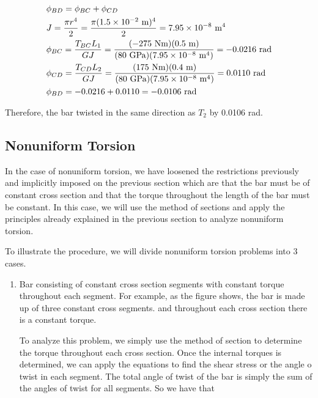 \documentclass[a4paper,openany,12pt]{book}
\begin{document}
$$\begin{gathered}
  \phi_{BD} = \phi _{BC} + \phi _{CD} \hfill \\
  J = \frac{\pi r^4}{2} = \frac{\pi (1.5 \times 10^{ - 2} \text{ m})^4}{2} =
  7.95 \times 10^{ - 8} \text{ m}^4 \hfill \\
  \phi_{BC} = \frac{T_{BC}L_1}{GJ} = \frac{( - 275\text{ Nm})(0.5\text{ m})}{(80\text{ GPa})(7.95 \times 10^{-8}\text{ m}^4)} =  - 0.0216\text{ rad} \hfill \\
  \phi_{CD} = \frac{T_{CD}L_2}{GJ} = \frac{(175\text{ Nm})(0.4\text{ m})}{(80\text{ GPa})(7.95 \times 10^{-8}\text{ m}^4)} = 0.0110\text{ rad} \hfill \\
  \phi_{BD} =  - 0.0216 + 0.0110 =  - 0.0106\text{ rad} \hfill \\ 
\end{gathered}$$

Therefore, the bar twisted in the same direction as \(T_2\) by 0.0106 rad.

\subsection{Nonuniform Torsion}
\label{nonuniform-torsion}
In the case of nonuniform torsion, we have loosened the restrictions
previously and implicitly imposed on the previous section which are that
the bar must be of constant cross section and that the torque throughout
the length of the bar must be constant. In this case, we will use the
method of sections and apply the principles already explained in the
previous section to analyze nonuniform torsion.

To illustrate the procedure, we will divide nonuniform torsion problems
into 3 cases.

\begin{enumerate}
\item Bar consisting of constant cross section segments with constant
torque throughout each segment. For example, as the figure shows, the
bar is made up of three constant cross segments. and throughout each
cross section there is a constant torque.

To analyze this problem, we simply use the method of section to
determine the torque throughout each cross section. Once the internal
torques is determined, we can apply the equations to find the shear
stress or the angle o twist in each segment. The total angle of twist
of the bar is simply the sum of the angles of twist for all segments.
So we have that
\end{enumerate}
\end{document}
